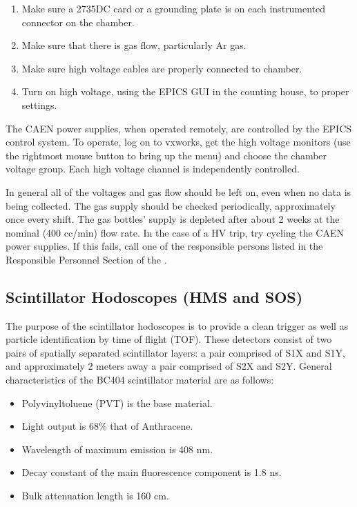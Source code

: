 \begin{enumerate}
\item {Make sure a 2735DC card or a grounding plate is on each instrumented
connector on the chamber.}
\item {Make sure that there is gas flow, particularly Ar gas.}
\item {Make sure high voltage cables are properly connected to
chamber.}
\item {Turn on high voltage, using the EPICS GUI in the counting house, 
to proper settings.}
\end{enumerate}

The CAEN power supplies, when operated remotely, are controlled by the
EPICS control system.  To operate, log on to vxworks, get the high
voltage monitors (use the rightmost mouse button to bring up the menu)
and choose the chamber voltage group.  Each high voltage channel is
independently controlled.

In general all of the voltages and gas flow should be left on, even when
no data is being collected.  The gas supply should be checked periodically,
approximately once every shift.  The gas bottles' supply is depleted
after about 2 weeks at the nominal (400 cc/min) flow rate.
In the case of a HV trip, try cycling the CAEN power supplies.  If this fails, call
one of the responsible persons listed in the Responsible Personnel Section 
of the .




\subsection{Scintillator Hodoscopes (HMS and SOS)}

The purpose of the scintillator hodoscopes is to provide a clean
trigger as well as particle identification by time of flight (TOF). These
detectors consist of two pairs of spatially separated scintillator
layers: a pair comprised of S1X and S1Y, and approximately 2 meters away a pair
comprised of S2X and S2Y. General characteristics of the BC404 scintillator
material are as follows:

\begin{itemize}
\item{Polyvinyltoluene (PVT) is the base material. }
\item{Light output is 68\% that of Anthracene. }
\item{Wavelength of maximum emission is 408 nm.}
\item{Decay constant of the main fluorescence component is 1.8 ns.}
\item{Bulk attenuation length is 160 cm.}
\end{itemize}

